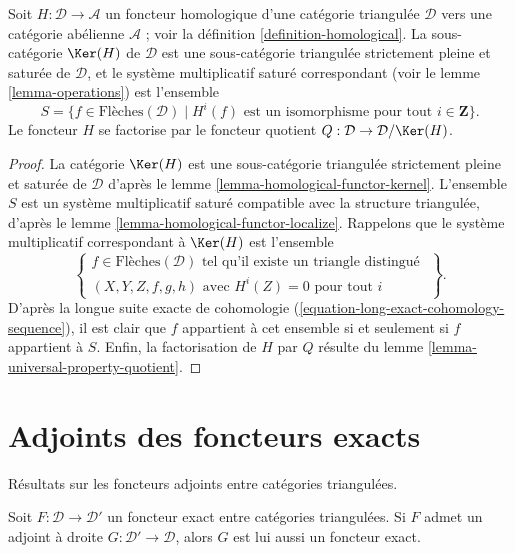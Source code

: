 \begin{lemma}
\label{lemma-acyclic-general}
Soit $H : \mathcal{D} \to \mathcal{A}$ un foncteur homologique d'une catégorie
triangulée $\mathcal{D}$ vers une catégorie abélienne $\mathcal{A}$ ; voir la
définition \ref{definition-homological}.
La sous-catégorie $\Ker(H)$ de $\mathcal{D}$ est une sous-catégorie triangulée
strictement pleine et saturée de $\mathcal{D}$, et le système multiplicatif
saturé correspondant (voir le lemme \ref{lemma-operations}) est l'ensemble
$$
S = \{f \in \text{Flèches}(\mathcal{D}) \mid
H^i(f)\text{ est un isomorphisme pour tout }i \in \mathbf{Z}\}.
$$
Le foncteur $H$ se factorise par le foncteur quotient
$Q : \mathcal{D} \to \mathcal{D}/\Ker(H)$.
\end{lemma}

\begin{proof}
La catégorie $\Ker(H)$ est une sous-catégorie triangulée strictement pleine et
saturée de $\mathcal{D}$ d'après le
lemme \ref{lemma-homological-functor-kernel}.
L'ensemble $S$ est un système multiplicatif saturé compatible avec la structure
triangulée, d'après le lemme \ref{lemma-homological-functor-localize}.
Rappelons que le système multiplicatif correspondant à $\Ker(H)$ est l'ensemble
$$
\left\{
\begin{matrix}
f \in \text{Flèches}(\mathcal{D})
\text{ tel qu'il existe un triangle distingué }\\
(X, Y, Z, f, g, h)\text{ avec } H^i(Z) = 0 \text{ pour tout }i
\end{matrix}
\right\}.
$$
D'après la longue suite exacte de cohomologie
(\ref{equation-long-exact-cohomology-sequence}), il est clair que $f$ appartient
à cet ensemble si et seulement si $f$ appartient à $S$.
Enfin, la factorisation de $H$ par $Q$ résulte du
lemme \ref{lemma-universal-property-quotient}.
\end{proof}

\section{Adjoints des foncteurs exacts}
\label{section-adjoints}

\noindent
Résultats sur les foncteurs adjoints entre catégories triangulées.

\begin{lemma}
\label{lemma-adjoint-is-exact}
Soit $F : \mathcal{D} \to \mathcal{D}'$ un foncteur exact entre catégories
triangulées. Si $F$ admet un adjoint à droite
$G: \mathcal{D'} \to \mathcal{D}$, alors $G$ est lui aussi un foncteur exact.
\end{lemma}

